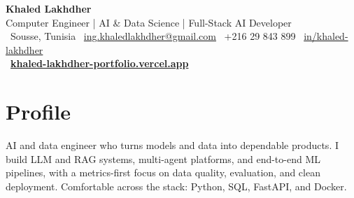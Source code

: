 \documentclass[11pt,a4paper]{article}
\begin{document}
\raggedright   %

\begin{center}
  {\LARGE\bfseries\color{accent} Khaled Lakhdher}\\[3pt]
  {\large\color{muted} Computer Engineer \;|\; AI \& Data Science \;|\; Full-Stack AI Developer}\\[5pt]
  {\small\color{muted}
    {\color{accent}\faMapMarker}~Sousse, Tunisia \quad
    {\color{accent}\faEnvelope}~\href{mailto:ing.khaledlakhdher@gmail.com}{ing.khaledlakhdher@gmail.com} \quad
    {\color{accent}\faPhone}~+216 29 843 899 \quad
    {\color{accent}\faLinkedin}~\href{https://www.linkedin.com/in/khaled-lakhdher}{in/khaled-lakhdher}
  }\\[3pt]
  {\small {\color{accent}\faGlobe}~\href{https://khaled-lakhdher-portfolio.vercel.app}{\textbf{\color{accent}khaled-lakhdher-portfolio.vercel.app}}}
\end{center}

\section{Profile}
AI and data engineer who turns models and data into dependable products. I build LLM and RAG systems,
multi-agent platforms, and end-to-end ML pipelines, with a metrics-first focus on data quality,
evaluation, and clean deployment. Comfortable across the stack: Python, SQL, FastAPI, and Docker.

\end{document}
